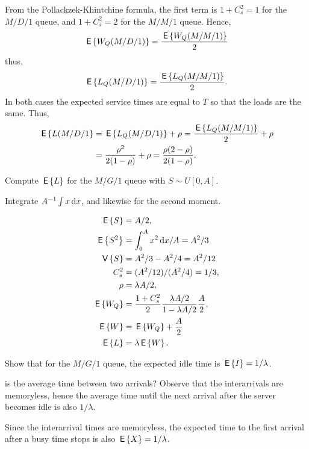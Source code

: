 \begin{exercise}
\begin{solution}
From the Pollackzek-Khintchine formula, the first term is $1+C_s^2=1$ for the $M/D/1$ queue, and $1+C_s^2=2$ for the $M/M/1$ queue. Hence, 
  \begin{equation*}
\,\mathsf{E}\left\{W_Q(M/D/1)\right\} = \frac{\,\mathsf{E}\left\{W_Q(M/M/1)\right\}}2
  \end{equation*}
thus, 
\begin{equation*}
 \,\mathsf{E}\left\{L_Q(M/D/1)\right\} = \frac{\,\mathsf{E}\left\{L_Q(M/M/1)\right\}}2.    
\end{equation*}
In both cases the expected service times are equal to $T$ so that the loads are the same. Thus, 
\begin{equation*}
  \begin{split}
 \,\mathsf{E}\left\{L(M/D/1\right\} &= \,\mathsf{E}\left\{L_Q(M/D/1)\right\} +\rho = \frac{\,\mathsf{E}\left\{L_Q(M/M/1)\right\}}2 + \rho \\
&= \frac{\rho^2}{2(1-\rho)} + \rho=\frac{\rho(2-\rho)} {2(1-\rho)}.
  \end{split}
\end{equation*}
\end{solution}
\end{exercise}

\begin{exercise}
  Compute $\,\mathsf{E}\left\{L\right\}$ for the $M/G/1$ queue with $S\sim U[0,A]$.
  \begin{hint}
Integrate $A^{-1} \int x \,\text{d}x$, and likewise for the second moment.
  \end{hint}
\begin{solution}
  \begin{align*}
\,\mathsf{E}\left\{S\right\} &= A/2,\\
\,\mathsf{E}\left\{S^2\right\} &= \int_0^A x^2 \,\text{d}x/A = A^2/3\\
\,\mathsf{V}\left\{S\right\} &= A^2/3 - A^2/4= A^2/12\\
C_s^2 &= (A^2/12)/(A^2/4) = 1/3,\\
\rho &= \lambda A/2,\\
\,\mathsf{E}\left\{W_Q\right\} &= \frac{1+C_s^2}2 \frac{\lambda A/2}{1-\lambda A/2}\frac A2, \\
\,\mathsf{E}\left\{W\right\} &= \,\mathsf{E}\left\{W_Q\right\} + \frac A2\\
\,\mathsf{E}\left\{L\right\} &= \lambda \,\mathsf{E}\left\{W\right\}.
  \end{align*}
\end{solution}
\end{exercise}


\begin{exercise}
  Show that for the $M/G/1$ queue, the expected idle time is
  $\,\mathsf{E}\left\{I\right\} = 1/\lambda$.  
  \begin{hint}
 is the average time between two
    arrivals? Observe that the interarrivals are memoryless, hence the
    average time until the next arrival after the server becomes idle
    is also $1/\lambda$.
  \end{hint}
  \begin{solution}
  Since the interarrival times are memoryless, the expected
      time to the first arrival after a busy time stops is also
      $\,\mathsf{E}\left\{X\right\}=1/\lambda$.
  \end{solution}
\end{exercise}

